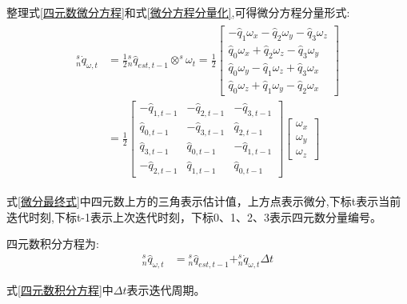 \documentclass[12pt,a4paper]{article}
\begin{document}
整理式\ref{四元数微分方程}和式\ref{微分方程分量化},可得微分方程分量形式:
\begin{eqnarray}
    \begin{aligned}
    ^s_n\dot{q}_{\omega,t}&=\frac{1}{2}{^s_n\hat{q}_{est,t-1}}\otimes^s\omega_t
    =\frac{1}{2}
    \left[\begin{array}{c}
            - \hat{q}_1 \omega_x - \hat{q}_2 \omega_y - \hat{q}_3 \omega_z \\
              \hat{q}_0 \omega_x + \hat{q}_2 \omega_z - \hat{q}_3 \omega_y \\
              \hat{q}_0 \omega_y - \hat{q}_1 \omega_z + \hat{q}_3 \omega_x \\
              \hat{q}_0 \omega_z + \hat{q}_1 \omega_y - \hat{q}_2 \omega_x
    \end{array}\right] \\
    &=\frac{1}{2}
    \left[ \begin{array}{rrr}
            -\hat{q}_{1,t-1} & -\hat{q}_{2,t-1} & -\hat{q}_{3,t-1} \\
             \hat{q}_{0,t-1} & -\hat{q}_{3,t-1} &  \hat{q}_{2,t-1} \\
             \hat{q}_{3,t-1} &  \hat{q}_{0,t-1} & -\hat{q}_{1,t-1} \\
            -\hat{q}_{2,t-1} &  \hat{q}_{1,t-1} &  \hat{q}_{0,t-1}
    \end{array} \right]
    \left[\begin{array}{c}
            \omega_{x} \\
            \omega_{y} \\
            \omega_{z}
    \end{array}\right] \label{微分最终式}
    \end{aligned}
\end{eqnarray}

式\ref{微分最终式}中四元数上方的三角表示估计值，上方点表示微分,下标t表示当前迭代时刻,下标t-1表示上次迭代时刻，下标0、1、2、3表示四元数分量编号。

四元数积分方程为:
\begin{eqnarray}\label{四元数积分方程}
    ^s_n\hat{q}_{\omega,t}&={^s_n\hat{q}_{est,t-1}}+^s_n\dot{q}_{\omega,t}\Delta t
\end{eqnarray}

式\ref{四元数积分方程}中$\Delta t$表示迭代周期。
\end{document}
